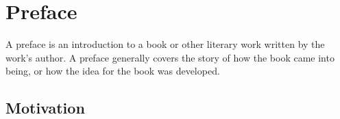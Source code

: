 

\chapter*{Preface}
A preface is an introduction to a book or other literary work
written by the work's author. A preface generally covers the story
of how the book came into being, or how the idea for the book was
developed.

\section*{Motivation} 
